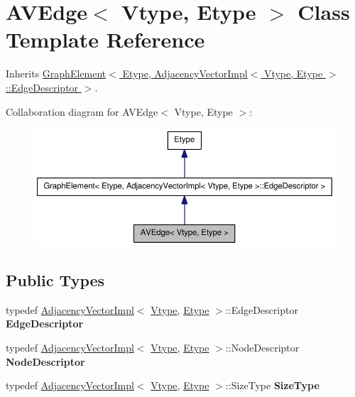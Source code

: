 \hypertarget{class_a_v_edge}{
\section{AVEdge$<$ Vtype, Etype $>$ Class Template Reference}
\label{class_a_v_edge}
}


Inherits \hyperlink{class_graph_element}{GraphElement$<$ Etype, AdjacencyVectorImpl$<$ Vtype, Etype $>$::EdgeDescriptor $>$}.



Collaboration diagram for AVEdge$<$ Vtype, Etype $>$:\nopagebreak
\begin{figure}[H]
\begin{center}
\leavevmode
\includegraphics[width=400pt]{class_a_v_edge__coll__graph}
\end{center}
\end{figure}
\subsection*{Public Types}
\begin{DoxyCompactItemize}
\item 
\hypertarget{class_a_v_edge_aca151ea10c7ab1c7c7a67ef77cba38dd}{
typedef \hyperlink{class_adjacency_vector_impl}{AdjacencyVectorImpl}$<$ \hyperlink{class_vtype}{Vtype}, \hyperlink{class_etype}{Etype} $>$::EdgeDescriptor {\bfseries EdgeDescriptor}}
\label{class_a_v_edge_aca151ea10c7ab1c7c7a67ef77cba38dd}

\item 
\hypertarget{class_a_v_edge_ac61237682ad0eb99b2c03b61b994aba2}{
typedef \hyperlink{class_adjacency_vector_impl}{AdjacencyVectorImpl}$<$ \hyperlink{class_vtype}{Vtype}, \hyperlink{class_etype}{Etype} $>$::NodeDescriptor {\bfseries NodeDescriptor}}
\label{class_a_v_edge_ac61237682ad0eb99b2c03b61b994aba2}

\item 
\hypertarget{class_a_v_edge_aa5054aa0248e28d70180ce9a7770b226}{
typedef \hyperlink{class_adjacency_vector_impl}{AdjacencyVectorImpl}$<$ \hyperlink{class_vtype}{Vtype}, \hyperlink{class_etype}{Etype} $>$::SizeType {\bfseries SizeType}}
\label{class_a_v_edge_aa5054aa0248e28d70180ce9a7770b226}

\end{DoxyCompactItemize}
